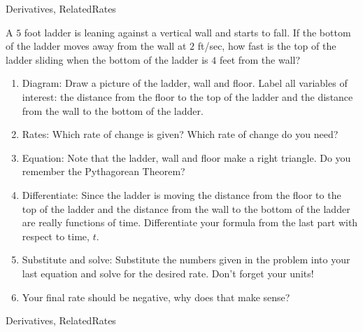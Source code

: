 \begin{tagblock}{Derivatives, RelatedRates}
\begin{question}
A $5$ foot ladder is leaning against a vertical wall and starts to fall.  If the bottom of the ladder moves away from the wall at $2$ ft/sec, how fast is the top of the ladder sliding when the bottom of the ladder is $4$ feet from the wall?
\begin{enumerate}
\item Diagram: Draw a picture of the ladder, wall and floor. Label all variables of interest: the distance from the floor to the top of the ladder and the distance from the wall to the bottom of the ladder.  
\vspace{1.5in}
\item Rates: Which rate of change is given? Which rate of change do you need?
\vspace{1in}
\item Equation: Note that the ladder, wall and floor make a right triangle.  Do you remember the Pythagorean Theorem?  
\vspace{1in}
\item Differentiate: Since the ladder is moving the distance from the floor to the top of the ladder and the distance from the wall to the bottom of the ladder are really functions of time. Differentiate your formula from the last part with respect to time, $t$.
\vspace{1.5in}
\item Substitute and solve: Substitute the numbers given in the problem into your last equation and solve for the desired rate.  Don't forget your units!
\vspace{3in}
\item Your final rate should be negative, why does that make sense?  
\end{enumerate}




	
\begin{tags}
	    Derivatives, RelatedRates
\end{tags}
	
\begin{diary}
\end{diary}
	
\begin{solution}
	   
\end{solution}
	
\end{question}

\end{tagblock}

